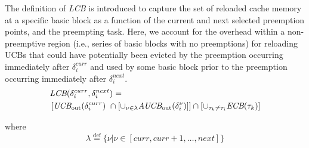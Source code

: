 The definition of \textit{LCB} is introduced to capture the set of reloaded cache memory at a specific basic block as a function of the current and next selected preemption points, and the preempting task.  Here, we account for the overhead within a non-preemptive region (i.e., series of basic blocks with no preemptions) for reloading UCBs that could have potentially been evicted by the preemption occurring immediately after $\delta_i^{curr}$ and used by some basic block prior to the preemption occurring immediately after $\delta_i^{next}$.
\begin{equation}\label{eqn:lcb-formula-1}
\begin{split}
    \lefteqn{\textit{LCB}(\delta_{i}^{curr},\delta_{i}^{next}) =} & \\
    &\left[\textit{UCB}_{\textrm{out}}(\delta_{i}^{curr})\ \cap \left[\cup_{\nu \in \lambda} \textit{AUCB}_{\textrm{out}}(\delta_{i}^{\nu})\right]\right] \cap [\cup_{\tau_{k}\neq\tau_{i}} \textit{ECB}(\tau_{k})]\\
\end{split}
\end{equation}

\noindent
where
\begin{equation*}\label{eqn:lcb-formula-1b}
    \lambda \stackrel{\text{def}}{=} \{ \nu|\nu \in [ \textit{curr}, \textit{curr}+1, \ldots, \textit{next} ] \}
\end{equation*}

